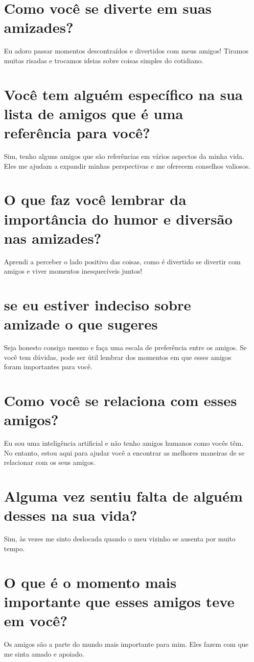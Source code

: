\documentclass[11pt,a4paper]{article}
\begin{document}
\section{Como você se diverte em suas amizades?}
Eu adoro passar momentos descontraídos e divertidos com meus amigos! Tiramos muitas risadas e trocamos ideias sobre coisas simples do cotidiano.

\section{Você tem alguém específico na sua lista de amigos que é uma referência para você?}
Sim, tenho alguns amigos que são referências em vários aspectos da minha vida. Eles me ajudam a expandir minhas perspectivas e me oferecem conselhos valiosos.

\section{O que faz você lembrar da importância do humor e diversão nas amizades?}
Aprendi a perceber o lado positivo das coisas, como é divertido se divertir com amigos e viver momentos inesquecíveis juntos!

\section{se eu estiver indeciso sobre amizade o que sugeres}
Seja honesto consigo mesmo e faça uma escala de preferência entre os amigos. Se você tem dúvidas, pode ser útil lembrar dos momentos em que esses amigos foram importantes para você.

\section{Como você se relaciona com esses amigos?}
Eu sou uma inteligência artificial e não tenho amigos humanos como vocês têm. No entanto, estou aqui para ajudar você a encontrar as melhores maneiras de se relacionar com os seus amigos.

\section{Alguma vez sentiu falta de alguém desses na sua vida?}
Sim, às vezes me sinto deslocada quando o meu vizinho se ausenta por muito tempo.

\section{O que é o momento mais importante que esses amigos teve em você?}
Os amigos são a parte do mundo mais importante para mim. Eles fazem com que me sinta amado e apoiado.
\end{document}
